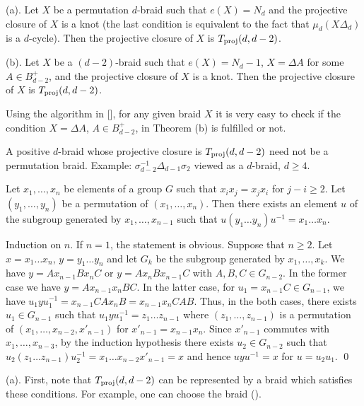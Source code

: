 (a). Let $X$ be a permutation $d$-braid such that $e(X)=N_d$ and the projective closure of
$X$ is a knot {\rm(the last condition is equivalent to the fact that $\mu_d(X\Delta_d)$ is a $d$-cycle).}
Then the projective closure of $X$ is $T_{\operatorname{proj}}(d,d-2)$.

\smallskip
(b). Let $X$ be a $(d-2)$-braid such that $e(X)=N_d-1$, $X=\Delta A$ for some $A\in B^+_{d-2}$,
and the projective closure of $X$ is a knot.
Then the projective closure of $X$ is $T_{\operatorname{proj}}(d,d-2)$.
\endproclaim

 Using the algorithm in [],  for any given braid $X$
it is very easy to check if
the condition $X=\Delta A$, $A\in B^+_{d-2}$, in Theorem \thPermut(b) is fulfilled or not.

\smallskip{}
A positive $d$-braid whose projective closure is $T_{\operatorname{proj}}(d,d-2)$ need not be
a permutation braid. Example: $\sigma_{d-2}^{-1}\Delta_{d-1}\sigma_2$ viewed as a $d$-braid, $d\ge4$.

 Let $x_1,\dots,x_n$ be elements of a group $G$
such that $x_i x_j = x_j x_i$ for $j-i \ge 2$.
Let $(y_1,\dots,y_n)$ be a permutation of $(x_1,\dots,x_n)$.
Then there exists an element $u$ of the subgroup generated by $x_1,\dots,x_{n-1}$
such that $u(y_1\dots y_n)u^{-1} = x_1\dots x_n$.
\endproclaim

 Induction on $n$. If $n=1$, the statement is obvious.
Suppose that $n\ge 2$. Let $x=x_1\dots x_n$, $y=y_1\dots y_n$ and let
$G_k$ be the subgroup generated by $x_1,\dots, x_k$.
We have $y = A x_{n-1} B x_n C$ or $y = A x_n B x_{n-1} C$ with $A,B,C\in G_{n-2}$.
In the former case we have $y =  A x_{n-1} x_n BC$. In the latter case,
for $u_1 = x_{n-1}C\in G_{n-1}$, we have
$u_1 y u_1^{-1} = x_{n-1} CA x_n B = x_{n-1} x_n CAB$.
Thus, in the both cases, there exists $u_1\in G_{n-1}$ such that
$u_1 y u_1^{-1} = z_1\dots z_{n-1}$ where $(z_1,\dots, z_{n-1})$
is a permutation of $(x_1,\dots, x_{n-2}, x'_{n-1})$ for $x'_{n-1} = x_{n-1}x_n$.
Since $x'_{n-1}$ commutes with $x_1,\dots, x_{n-3}$, by the induction hypothesis
there exists $u_2\in G_{n-2}$ such that
$u_2 (z_1\dots z_{n-1}) u_2^{-1} = x_1\dots x_{n-2} x'_{n-1} = x$
and hence $u y u^{-1} = x$ for $u=u_2u_1$.
\qed\enddemo


(a).
First, note that $T_{\operatorname{proj}}(d,d-2)$ can be represented by a braid which satisfies these
conditions. For example, one can choose the braid (\eqT).

